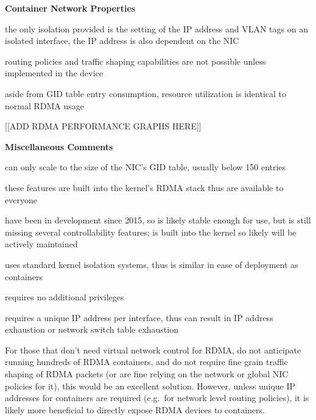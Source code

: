 \documentclass[12pt,titlepage]{article}
\begin{document}
\noindent
\textbf{Container Network Properties}
\begin{description}[nolistsep,font={{\scshape\bfseries}}]
	\item[Network Isolation] the only isolation provided is the setting of the IP address and VLAN tags on an isolated interface, the IP address is also dependent on the NIC
	\item[Controllability] routing policies and traffic shaping capabilities are not possible unless implemented in the device
	\item[Resource Utilization] aside from GID table entry consumption, resource utilization is identical to normal RDMA usage
\end{description}

[[ADD RDMA PERFORMANCE GRAPHS HERE]]

\noindent
\textbf{Miscellaneous Comments}
\begin{description}[nolistsep,font={{\scshape\bfseries}}]
	\item[Scalability Limits] can only scale to the size of the NIC's GID table, usually below 150 entries
	\item[Proprietary] these features are built into the kernel's RDMA stack thus are available to everyone
	\item[Maturity] have been in development since 2015, so is likely stable enough for use, but is still missing several controllability features; is built into the kernel so likely will be actively maintained
	\item[Ease in Deployment] uses standard kernel isolation systems, thus is similar in ease of deployment as containers
	\item[Execution Privileges] requires no additional privileges
	\item[Network Pressure] requires a unique IP address per interface, thus can result in IP address exhaustion or network switch table exhaustion
\end{description}

For those that don't need virtual network control for RDMA, do not anticipate running hundreds of RDMA containers, and do not require fine grain traffic shaping of RDMA packets (or are fine relying on the network or global NIC policies for it), this would be an excellent solution.
However, unless unique IP addresses for containers are required (e.g.\ for network level routing policies), it is likely more beneficial to directly expose RDMA devices to containers.
\end{document}
